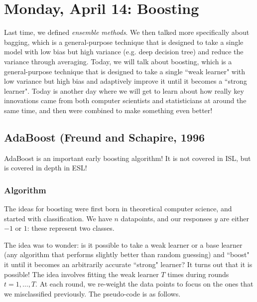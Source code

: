 \section{Monday, April 14: Boosting}

Last time, we defined \emph{ensemble methods}. We then talked more specifically about bagging, which is a general-purpose technique that is designed to take a single model with low bias but high variance (e.g. deep decision tree) and reduce the variance through averaging. Today, we will talk about boosting, which is a general-purpose technique that is designed to take a single ``weak learner" with low variance but high bias and adaptively improve it until it becomes a ``strong learner". Today is another day where we will get to learn about how really key innovations came from both computer scientists and statisticians at around the same time, and then were combined to make something even better!

\subsection{AdaBoost (Freund and Schapire, 1996}

AdaBoost is an important early boosting algorithm! It is not covered in ISL, but is covered in depth in ESL!

\subsubsection{Algorithm}

The ideas for boosting were first born in theoretical computer science, and started with classification. We have $n$ datapoints, and our responses $y$ are either $-1$ or $1$: these represent two classes. 

The idea was to wonder: is it possible to take a weak learner or a base learner (any algorithm that performs slightly better than random guessing) and ``boost" it until it becomes an arbitrarily accurate ``strong" learner? It turns out that it is possible! The idea involves fitting the weak learner $T$ times during rounds $t=1,\ldots,T$. At each round, we re-weight the data points to focus on the ones that we misclassified previously. The pseudo-code is as follows.

